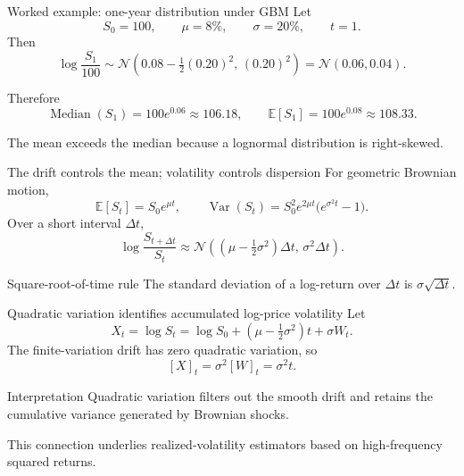 \documentclass[handout,10pt,aspectratio=169]{beamer}
\newcommand{\E}{\mathbb E}
\begin{document}
\begin{frame}{Worked example: one-year distribution under GBM}
Let
\[
S_0=100,
\qquad \mu=8\%,
\qquad \sigma=20\%,
\qquad t=1.
\]
Then
\[
\log\frac{S_1}{100}
\sim\mathcal N(0.08-\tfrac12(0.20)^2,\,(0.20)^2)
=\mathcal N(0.06,0.04).
\]

Therefore
\[
\operatorname{Median}(S_1)=100e^{0.06}\approx106.18,
\qquad
\E[S_1]=100e^{0.08}\approx108.33.
\]

The mean exceeds the median because a lognormal distribution is right-skewed.
\end{frame}

\begin{frame}{The drift controls the mean; volatility controls dispersion}
For geometric Brownian motion,
\[
\E[S_t]=S_0e^{\mu t},
\qquad
\operatorname{Var}(S_t)
=S_0^2e^{2\mu t}\bigl(e^{\sigma^2t}-1\bigr).
\]
Over a short interval \(\Delta t\),
\[
\log\frac{S_{t+\Delta t}}{S_t}
\approx\mathcal N\!\left(
\left(\mu-\tfrac12\sigma^2\right)\Delta t,\,
\sigma^2\Delta t
\right).
\]
\begin{block}{Square-root-of-time rule}
The standard deviation of a log-return over \(\Delta t\) is \(\sigma\sqrt{\Delta t}\).
\end{block}
\end{frame}

\begin{frame}{Quadratic variation identifies accumulated log-price volatility}
Let
\[
X_t=\log S_t
=\log S_0+\left(\mu-\tfrac12\sigma^2\right)t+\sigma W_t.
\]
The finite-variation drift has zero quadratic variation, so
\[
\boxed{[X]_t=\sigma^2[W]_t=\sigma^2t.}
\]
\begin{block}{Interpretation}
Quadratic variation filters out the smooth drift and retains the cumulative variance generated by Brownian shocks.
\end{block}
This connection underlies realized-volatility estimators based on high-frequency squared returns.
\end{frame}
\end{document}
